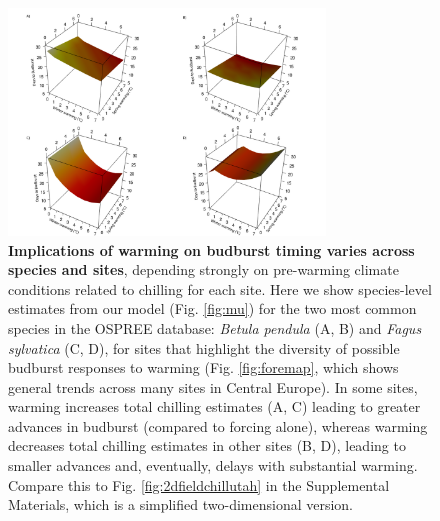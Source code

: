 \documentclass{article}
\begin{document}
\begin{figure}[h!]
\centering
\noindent \includegraphics[width=0.75\textwidth]{..//..//analyses/bb_analysis/figures/forecasting/tempforecastbothspp_1_7_degwarm3D_utah.png}
\caption{\textbf{Implications of warming on budburst timing varies across species and sites}, depending strongly on pre-warming climate conditions related to chilling for each site. Here we show species-level estimates from our model (Fig. \ref{fig:mu}) for the two most common species in the OSPREE database: \emph{Betula pendula} (A, B) and \emph{Fagus sylvatica} (C, D), for sites that highlight the diversity of possible budburst responses to warming (Fig. \ref{fig:foremap}, which shows general trends across many sites in Central Europe). In some sites, warming increases total chilling estimates (A, C) leading to greater advances in budburst (compared to forcing alone), whereas warming decreases total chilling estimates in other sites (B, D), leading to smaller advances and, eventually, delays with substantial warming. Compare this to Fig. \ref{fig:2dfieldchillutah} in the Supplemental Materials, which is a simplified two-dimensional version.}
\label{fig:betfag3d}
\end{figure}

\end{document}
